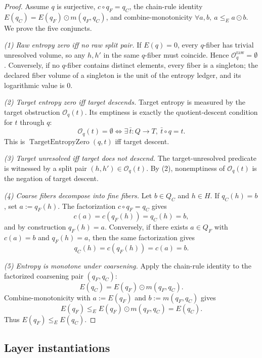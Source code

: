 \documentclass[11pt]{article}
\theoremstyle{definition}
\begin{document}
\begin{proof}
Assume \(q\) is surjective, \(c\circ q_F=q_C\), the chain-rule
identity \(E(q_C)=E(q_F)\odot m(q_F,q_C)\), and combine-monotonicity
\(\forall a,b,\ a\le_E a\odot b\).  We prove the five conjuncts.

\emph{(1) Raw entropy zero iff no raw split pair.}
If \(E(q)=0\), every \(q\)-fiber has trivial unresolved volume, so
any \(h,h'\) in the same \(q\)-fiber must coincide.  Hence
\(\mathcal O_q^{\mathrm{raw}}=\emptyset\).  Conversely, if no
\(q\)-fiber contains distinct elements, every fiber is a singleton;
the declared fiber volume of a singleton is the unit of the entropy
ledger, and its logarithmic value is \(0\).

\emph{(2) Target entropy zero iff target descends.}
Target entropy is measured by the target obstruction
\(\mathcal O_q(t)\).  Its emptiness is exactly the quotient-descent
condition for \(t\) through \(q\):
\[
  \mathcal O_q(t)=\emptyset
  \iff
  \exists\,\bar t:Q\to T,\ \bar t\circ q=t.
\]
This is \(\operatorname{TargetEntropyZero}(q,t)\) iff target descent.

\emph{(3) Target unresolved iff target does not descend.}
The target-unresolved predicate is witnessed by a split pair
\((h,h')\in\mathcal O_q(t)\).  By (2), nonemptiness of
\(\mathcal O_q(t)\) is the negation of target descent.

\emph{(4) Coarse fibers decompose into fine fibers.}
Let \(b\in Q_C\) and \(h\in H\).  If \(q_C(h)=b\), set
\(a:=q_F(h)\).  The factorization \(c\circ q_F=q_C\) gives
\[
  c(a)=c(q_F(h))=q_C(h)=b,
\]
and by construction \(q_F(h)=a\).  Conversely, if there exists
\(a\in Q_F\) with \(c(a)=b\) and \(q_F(h)=a\), then the same
factorization gives
\[
  q_C(h)=c(q_F(h))=c(a)=b.
\]

\emph{(5) Entropy is monotone under coarsening.}
Apply the chain-rule identity to the factorized coarsening pair
\((q_F,q_C)\):
\[
  E(q_C)=E(q_F)\odot m(q_F,q_C).
\]
Combine-monotonicity with \(a:=E(q_F)\) and \(b:=m(q_F,q_C)\) gives
\[
  E(q_F)\le_E E(q_F)\odot m(q_F,q_C)=E(q_C).
\]
Thus \(E(q_F)\le_E E(q_C)\).
\end{proof}

\subsection*{Layer instantiations}\label{layer-inst:F39}
\end{document}
